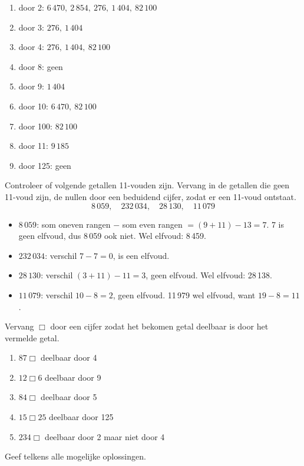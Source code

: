 \documentclass{bis}
\begin{document}
\begin{solution}
\begin{enumerate}
  \item door 2: $6\,470,\ 2\,854,\ 276,\ 1\,404,\ 82\,100$
  \item door 3: $276,\ 1\,404$
  \item door 4: $276,\ 1\,404,\ 82\,100$
  \item door 8: geen
  \item door 9: $1\,404$
  \item door 10: $6\,470,\ 82\,100$
  \item door 100: $82\,100$
  \item door 11: $9\,185$
  \item door 125: geen
\end{enumerate}
\end{solution}

\begin{exercise}
Controleer of volgende getallen 11-vouden zijn. Vervang in de getallen die geen 11-voud zijn, de
nullen door een beduidend cijfer, zodat er een 11-voud ontstaat.
\[8\,059,\quad232\,034,\quad28\,130,\quad11\,079\]
\end{exercise}

\begin{solution}
\begin{itemize}
  \item $8\,059$: som oneven rangen $-$ som even rangen $=(9+11)-13=7$. 7 is geen elfvoud, dus
  8\,059 ook niet. Wel elfvoud: 8\,459.
  \item $232\,034$: verschil $7-7=0$, is een elfvoud.
  \item $28\,130$: verschil $(3+11)-11=3$, geen elfvoud. Wel elfvoud: 28\,138.
  \item $11\,079$: verschil $10-8=2$, geen elfvoud. 11\,979 wel elfvoud, want $19-8=11$.
\end{itemize}
\end{solution}

\begin{exercise}
Vervang $\Box$ door een cijfer zodat het bekomen getal deelbaar is door het vermelde getal.
\begin{enumerate}
  \item $87\Box$ deelbaar door 4
  \item $12\Box6$ deelbaar door 9
  \item $84\Box$ deelbaar door 5
  \item $15\Box25$ deelbaar door 125
  \item $234\Box$ deelbaar door 2 maar niet door 4
\end{enumerate}
Geef telkens alle mogelijke oplossingen.
\end{exercise}
\end{document}
